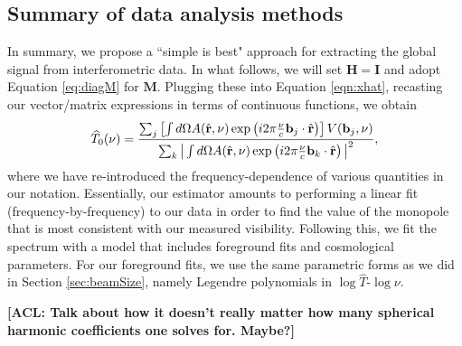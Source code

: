 \documentclass[twolcolumn,apj,iop,numberedappendix]{emulateapj}
\newcommand{\Hmat}{\mathbf{H}}
\newcommand{\M}{\mathbf{M}}
\newcommand{\rhat}{\hat{\mathbf{r}}}
\newcommand{\acl}[1]{{\color{red} \textbf{[ACL:  #1]}}}
\begin{document}
\subsection{Summary of data analysis methods}

In summary, we propose a ``simple is best" approach for extracting the global signal from interferometric data. In what follows, we will set $\Hmat = \mathbf{I}$ and adopt Equation \eqref{eq:diagM} for $\M$. Plugging these into Equation \eqref{eqn:xhat}, recasting our vector/matrix expressions in terms of continuous functions, we obtain
\begin{equation}
\label{eq:IntegralEstInterferometer}
\widehat{T}_0 (\nu)= \frac{\sum_j \left[ \int d\Omega A(\rhat, \nu) \exp\left( i 2 \pi \frac{\nu }{c} \mathbf{b}_j \cdot \rhat \right)\right] V(\mathbf{b}_j, \nu)}{\sum_k \big{|} \int d\Omega A(\rhat, \nu) \exp\left( i 2 \pi \frac{\nu }{c} \mathbf{b}_k \cdot \rhat \right) \big{|}^2},
\end{equation}
where we have re-introduced the frequency-dependence of various quantities in our notation. Essentially, our estimator amounts to performing a linear fit (frequency-by-frequency) to our data in order to find the value of the monopole that is most consistent with our measured visibility. Following this, we fit the spectrum with a model that includes foreground fits and cosmological parameters. For our foreground fits, we use the same parametric forms as we did in Section \ref{sec:beamSize}, namely Legendre polynomials in $\log \widehat{T}$-$\log \nu$.

\acl{Talk about how it doesn't really matter how many spherical harmonic coefficients one solves for. Maybe?}


\end{document}
